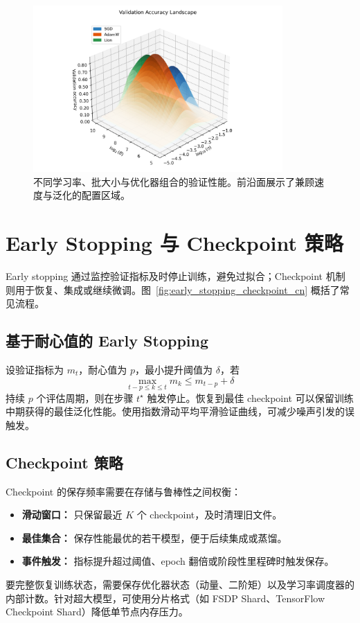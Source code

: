 \documentclass[UTF8,zihao=-4]{ctexart}
\begin{document}
\begin{figure}[H]
  \centering
  \includegraphics[width=0.85\textwidth]{hyperparameter_landscape.png}
  \caption{不同学习率、批大小与优化器组合的验证性能。前沿面展示了兼顾速度与泛化的配置区域。}
  \label{fig:hyperparameter_landscape_cn}
\end{figure}
\FloatBarrier

\section{Early Stopping 与 Checkpoint 策略}
Early stopping 通过监控验证指标及时停止训练，避免过拟合；Checkpoint 机制则用于恢复、集成或继续微调。图~\ref{fig:early_stopping_checkpoint_cn} 概括了常见流程。

\subsection{基于耐心值的 Early Stopping}
设验证指标为 $m_t$，耐心值为 $p$，最小提升阈值为 $\delta$，若
\begin{equation}
  \max_{t - p \le k \le t} m_k \le m_{t-p} + \delta
\end{equation}
持续 $p$ 个评估周期，则在步骤 $t^\star$ 触发停止。恢复到最佳 checkpoint 可以保留训练中期获得的最佳泛化性能。使用指数滑动平均平滑验证曲线，可减少噪声引发的误触发。

\subsection{Checkpoint 策略}
Checkpoint 的保存频率需要在存储与鲁棒性之间权衡：
\begin{itemize}
  \item \textbf{滑动窗口：} 只保留最近 $K$ 个 checkpoint，及时清理旧文件。
  \item \textbf{最佳集合：} 保存性能最优的若干模型，便于后续集成或蒸馏。
  \item \textbf{事件触发：} 指标提升超过阈值、epoch 翻倍或阶段性里程碑时触发保存。
\end{itemize}
要完整恢复训练状态，需要保存优化器状态（动量、二阶矩）以及学习率调度器的内部计数。针对超大模型，可使用分片格式（如 FSDP Shard、TensorFlow Checkpoint Shard）降低单节点内存压力。
\end{document}
